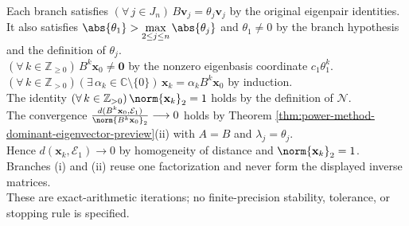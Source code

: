 \begin{computationmethod}
\begin{enumerate}[label=(\roman*)]
\end{enumerate}
Each branch satisfies $(\forall\,j\in J_n)\,B\mathbf{v}_j=\theta_j\mathbf{v}_j$ by the original eigenpair identities.\\
It also satisfies $\abs{\theta_1}>\max\limits_{2\leq j\leq n}\abs{\theta_j}$ and $\theta_1\neq0$ by the branch hypothesis and the definition of $\theta_j$.\\
$(\forall\,k\in\mathbb{Z}_{\geq0})\,B^k\mathbf{x}_0\neq\mathbf{0}$ by the nonzero eigenbasis coordinate $c_1\theta_1^k$. $(\forall\,k\in\mathbb{Z}_{>0})(\exists\,\alpha_k\in\mathbb{C}\setminus\{0\})\,\mathbf{x}_k=\alpha_kB^k\mathbf{x}_0$ by induction.\\
The identity $(\forall\,k\in\mathbb{Z}_{>0})\,\norm{\mathbf{x}_k}_2=1$ holds by the definition of $\mathcal{N}$.\\
The convergence $\frac{d(B^k\mathbf{x}_0,\mathcal{E}_1)}{\norm{B^k\mathbf{x}_0}_2}\longrightarrow0$ holds by Theorem \ref{thm:power-method-dominant-eigenvector-preview}(ii) with $A=B$ and $\lambda_j=\theta_j$.\\
Hence $d(\mathbf{x}_k,\mathcal{E}_1)\longrightarrow0$ by homogeneity of distance and $\norm{\mathbf{x}_k}_2=1$.\\
Branches (i) and (ii) reuse one factorization and never form the displayed inverse matrices.\\
These are exact-arithmetic iterations; no finite-precision stability, tolerance, or stopping rule is specified.
\end{computationmethod}
